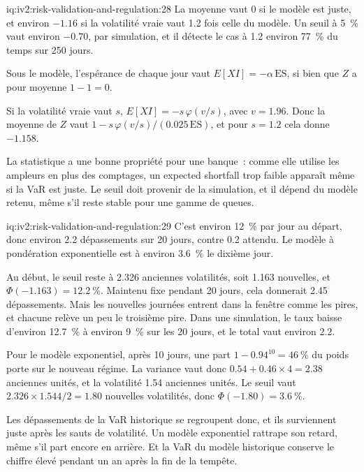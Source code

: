 \begin{solution}{iq:iv2:risk-validation-and-regulation:28}
La moyenne vaut 0 si le modèle est juste, et environ $-1.16$ si la volatilité vraie vaut 1.2 fois celle du modèle. Un seuil à 5~\% vaut environ $-0.70$, par simulation, et il détecte le cas à 1.2 environ 77~\% du temps sur 250 jours.

Sous le modèle, l'espérance de chaque jour vaut $E[X I] = -\alpha\,\mathrm{ES}$, si bien que $Z$ a pour moyenne $1 - 1 = 0$.

Si la volatilité vraie vaut $s$, $E[X I] = -s\,\varphi(v/s)$, avec $v = 1.96$. Donc la moyenne de $Z$ vaut $1 - s\,\varphi(v/s)/(0.025\,\mathrm{ES})$, et pour $s = 1.2$ cela donne $-1.158$.

La statistique a une bonne propriété pour une banque~: comme elle utilise les ampleurs en plus des comptages, un expected shortfall trop faible apparaît même si la VaR est juste. Le seuil doit provenir de la simulation, et il dépend du modèle retenu, même s'il reste stable pour une gamme de queues.

\end{solution}

\begin{solution}{iq:iv2:risk-validation-and-regulation:29}
C'est environ 12~\% par jour au départ, donc environ 2.2 dépassements sur 20 jours, contre 0.2 attendu. Le modèle à pondération exponentielle est à environ 3.6~\% le dixième jour.

Au début, le seuil reste à 2.326 anciennes volatilités, soit 1.163 nouvelles, et $\Phi(-1.163) = 12.2~\%$. Maintenu fixe pendant 20 jours, cela donnerait 2.45 dépassements. Mais les nouvelles journées entrent dans la fenêtre comme les pires, et chacune relève un peu le troisième pire. Dans une simulation, le taux baisse d'environ 12.7~\% à environ 9~\% sur les 20 jours, et le total vaut environ 2.2.

Pour le modèle exponentiel, après 10 jours, une part $1 - 0.94^{10} = 46~\%$ du poids porte sur le nouveau régime. La variance vaut donc $0.54 + 0.46 \times 4 = 2.38$ anciennes unités, et la volatilité 1.54 anciennes unités. Le seuil vaut $2.326 \times 1.544/2 = 1.80$ nouvelles volatilités, donc $\Phi(-1.80) = 3.6~\%$.

Les dépassements de la VaR historique se regroupent donc, et ils surviennent juste après les sauts de volatilité. Un modèle exponentiel rattrape son retard, même s'il part encore en arrière. Et la VaR du modèle historique conserve le chiffre élevé pendant un an après la fin de la tempête.

\end{solution}

